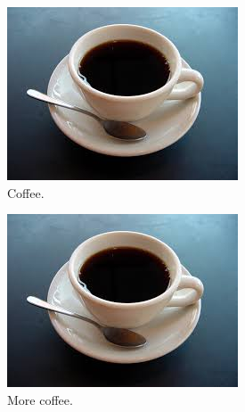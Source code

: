 \documentclass{article}
\begin{document}
\begin{figure}[h!]
  \centering
  \begin{subfigure}[b]{0.2\linewidth}
    \includegraphics[width=\linewidth]{coffee.jpg}
     \caption{Coffee.}
  \end{subfigure}
  \begin{subfigure}[b]{0.2\linewidth}
    \includegraphics[width=\linewidth]{coffee.jpg}
    \caption{More coffee.}
  \end{subfigure}
  \begin{subfigure}[b]{0.2\linewidth}

\end{subfigure}
\end{figure}
\end{document}
